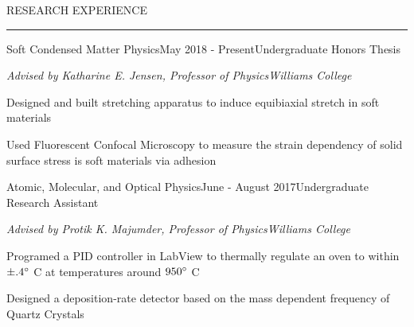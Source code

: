 \documentclass{short_resume} %
\renewenvironment{rSection}[1]{
	\sectionskip
	\textcolor{RoyalPurple}{\MakeUppercase{#1}}
	\sectionlineskip
	\hrule
	\begin{list}{}{
			\setlength{\leftmargin}{1.5em}
		}
		\item[]
	}{
	\end{list}
}
\begin{document}
	
	
		\vspace{-1em}

	
	\begin{rSection}{Research Experience}
		
		\begin{rSubsection}{Soft Condensed Matter Physics}{May 2018 - Present}{Undergraduate Honors Thesis}{}
			\vspace{-.5em}
				\item[] {\em Advised by Katharine E. Jensen, Professor of Physics}\hfill {\em Williams College}
				\item Designed and built stretching apparatus to induce equibiaxial stretch in soft materials
				\item Used Fluorescent Confocal Microscopy to measure the strain dependency of solid surface stress is soft materials via adhesion
		\end{rSubsection}
%		


		\begin{rSubsection}{Atomic, Molecular, and Optical Physics}{June - August 2017}{Undergraduate Research Assistant}{}
			\vspace{-.5em}
			\item[] {\em Advised by Protik K. Majumder, Professor of Physics}\hfill {\em Williams College}
			\item Programed a PID controller in LabView to thermally regulate an oven to within $\pm .4\degree$ C at temperatures around $ 950\degree $ C
			\item Designed a deposition-rate detector based on the mass dependent frequency of Quartz Crystals
		\end{rSubsection}

\end{rSection}
\end{document}
